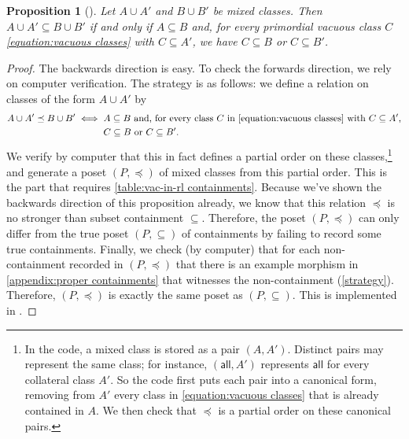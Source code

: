 \documentclass{amsart}
\newcommand{\computerassisted}{\faLaptopCode}
\newcommand{\all}{\mathsf{all}}
\numberwithin{equation}{section}
\newtheorem{proposition}[equation]{Proposition}
\theoremstyle{definition}
\begin{document}
\begin{proposition}[\computerassisted]
	\label{ordering on rlp of morphisms}
	Let $A \cup A'$ and $B \cup B'$ be mixed classes. Then $A \cup A' \subseteq B \cup B'$ if and only if $A \subseteq B$ and, for every primordial vacuous class $C$ \eqref{equation:vacuous classes} with $C \subseteq A'$, we have $C \subseteq B$ or $C \subseteq B'$.
\end{proposition}

\begin{proof}
	The backwards direction is easy. To check the forwards direction, we rely on computer verification. The strategy is as follows: we define a relation on classes of the form $A \cup A'$ by
	\begin{align*}
		A \cup A' \preceq B \cup B' \iff{} & A \subseteq B \text{ and, for every class $C$ in \eqref{equation:vacuous classes} with $C \subseteq A'$,} \\
			                                   & C \subseteq B \text{ or } C \subseteq B'.
	\end{align*}
	We verify by computer that this in fact defines a partial order on these classes,\footnote{In the code, a mixed class is stored as a pair $(A, A')$. Distinct pairs may represent the same class; for instance, $(\all, A')$ represents $\all$ for every collateral class $A'$. So the code first puts each pair into a canonical form, removing from $A'$ every class in \eqref{equation:vacuous classes} that is already contained in $A$. We then check that $\preceq$ is a partial order on these canonical pairs.} and generate a poset $(P,\preceq)$ of mixed classes from this partial order. This is the part that requires \cref{table:vac-in-rl containments}. Because we've shown the backwards direction of this proposition already, we know that this relation $\preceq$ is no stronger than subset containment $\subseteq$. Therefore, the poset $(P,\preceq)$ can only differ from the true poset $(P, \subseteq)$ of containments by failing to record some true containments. Finally, we check (by computer) that for each non-containment recorded in $(P, \preceq)$ that there is an example morphism in \cref{appendix:proper containments} that witnesses the non-containment (\cref{strategy}). Therefore, $(P, \preceq)$ is exactly the same poset as $(P, \subseteq)$. This is implemented in \cite{code}.
\end{proof}
\end{document}

